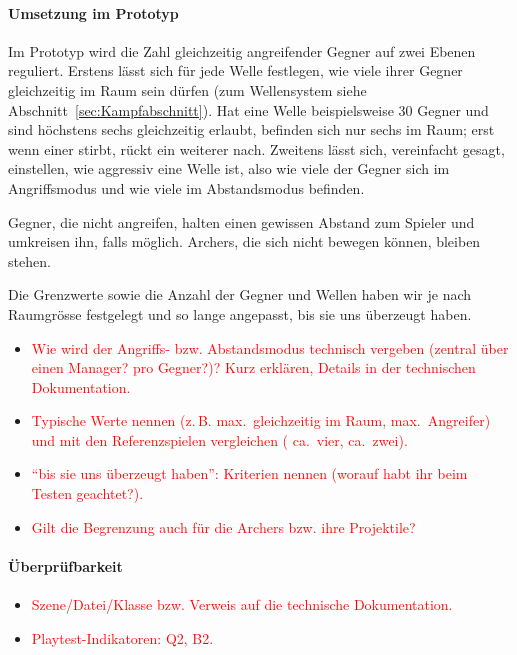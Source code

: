 \documentclass[../Main.tex]{subfiles}
\begin{document}
\paragraph{Umsetzung im Prototyp}
Im Prototyp wird die Zahl gleichzeitig angreifender Gegner auf zwei Ebenen reguliert. Erstens lässt sich für jede Welle festlegen, wie viele ihrer Gegner gleichzeitig im Raum sein dürfen (zum Wellensystem siehe Abschnitt~\ref{sec:Kampfabschnitt}). Hat eine Welle beispielsweise 30 Gegner und sind höchstens sechs gleichzeitig erlaubt, befinden sich nur sechs im Raum; erst wenn einer stirbt, rückt ein weiterer nach. Zweitens lässt sich, vereinfacht gesagt, einstellen, wie aggressiv eine Welle ist, also wie viele der Gegner sich im Angriffsmodus und wie viele im Abstandsmodus befinden.

Gegner, die nicht angreifen, halten einen gewissen Abstand zum Spieler und umkreisen ihn, falls möglich. Archers, die sich nicht bewegen können, bleiben stehen.

Die Grenzwerte sowie die Anzahl der Gegner und Wellen haben wir je nach Raumgrösse festgelegt und so lange angepasst, bis sie uns überzeugt haben.

\begin{itemize}[leftmargin=1.5cm]
    \item \textcolor{red}{Wie wird der Angriffs- bzw. Abstandsmodus technisch vergeben (zentral über einen Manager? pro Gegner?)? Kurz erklären, Details in der technischen Dokumentation.}
    \item \textcolor{red}{Typische Werte nennen (z.\,B. max.\ gleichzeitig im Raum, max.\ Angreifer) und mit den Referenzspielen vergleichen ( ca.\ vier,  ca.\ zwei).}
    \item \textcolor{red}{\enquote{bis sie uns überzeugt haben}: Kriterien nennen (worauf habt ihr beim Testen geachtet?).}
    \item \textcolor{red}{Gilt die Begrenzung auch für die Archers bzw. ihre Projektile?}
\end{itemize}

\paragraph{Überprüfbarkeit}
\begin{itemize}[leftmargin=1.5cm]
    \item \textcolor{red}{Szene/Datei/Klasse bzw. Verweis auf die technische Dokumentation.}
    \item \textcolor{red}{Playtest-Indikatoren: Q2, B2.}
\end{itemize}
\end{document}
